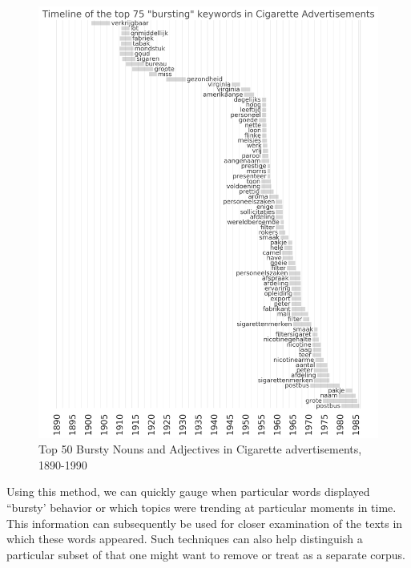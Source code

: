 \documentclass[USenglish]{article}
\begin{document}
\begin{figure}%
  \centering
  \includegraphics[width=.9\textwidth]{figures/bursts_top50}%
  \caption{Top 50 Bursty Nouns and Adjectives in Cigarette advertisements, 1890-1990}%
  \label{fig:burst_words}%
\end{figure}

Using this method, we can quickly gauge when particular words displayed ``bursty' behavior or which topics were trending at particular moments in time. This information can subsequently be used for closer examination of the texts in which these words appeared. Such techniques can also help distinguish a particular subset of that one might want to remove or treat as a separate corpus. 
\end{document}
